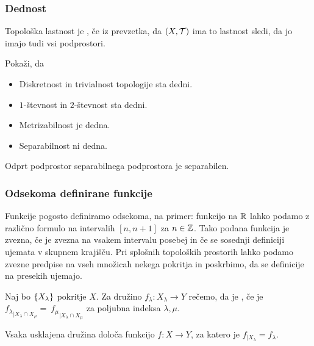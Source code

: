 \subsubsection{Dednost}
\begin{definicija}
    Topološka lastnost je , če iz prevzetka, da $(X, \mathcal{T})$ ima to lastnost sledi, da jo imajo tudi vsi podprostori.
\end{definicija}

\begin{primer}
    Pokaži, da
    \begin{itemize}
        \item Diskretnost in trivialnost topologije sta dedni.
        \item $1$-števnost in $2$-števnost sta dedni.
        \item Metrizabilnost je dedna.
        \item Separabilnost ni dedna.
    \end{itemize}
\end{primer}

\begin{opomba}
    Odprt podprostor separabilnega podprostora je separabilen.
\end{opomba}

\subsubsection{Odsekoma definirane funkcije}
Funkcije pogosto definiramo odsekoma, na primer: funkcijo na $\mathbb{R}$ lahko  podamo z različno formulo na intervalih $[n, n+1]$ za $n \in \mathbb{Z}$. Tako podana funkcija je zvezna, če je zvezna na vsakem intervalu posebej in če se sosednji definiciji ujemata v skupnem krajišču. Pri splošnih topoloških prostorih lahko podamo zvezne predpise na vseh množicah nekega pokritja in poskrbimo, da se definicije na presekih ujemajo.

\begin{definicija}
    Naj bo $\left\{X_\lambda\right\}$ pokritje $X$. Za družino $f_\lambda: X_\lambda \to Y$ rečemo, da je , če je ${f_\lambda}_{|X_\lambda \cap X_\mu} =~{f_\mu}_{|X_\lambda \cap X_\mu}$ za poljubna indeksa $\lambda, \mu$.
\end{definicija}

\begin{trditev}
    Vsaka usklajena družina določa funkcijo $f: X \to Y$, za katero je $f_{|X_\lambda} = f_\lambda$.
\end{trditev}

